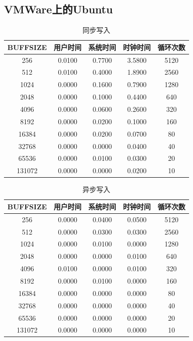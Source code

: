 \documentclass[a4paper,twoside]{article}
\begin{document}
\begin{spacing}{1.2}
\subsection{VMWare上的Ubuntu}


\begin{table}[H]
\centering
\caption{同步写入}
\begin{tabular}{c|c|c|c|c}
	\toprule
	\hline
	BUFFSIZE & 用户时间 & 系统时间 & 时钟时间 & 循环次数 \\
	\hline
	256   &   0.0100 & 0.7700 & 3.5800 & 5120
	\\512   &   0.0100 & 0.4000 & 1.8900 & 2560
	\\1024  &   0.0000 & 0.1600 & 0.7900 & 1280
	\\2048  &   0.0000 & 0.1000 & 0.4400 & 640
	\\4096  &   0.0000 & 0.0600 & 0.2600 & 320
	\\8192  &   0.0000 & 0.0200 & 0.1000 & 160
	\\16384 &   0.0000 & 0.0200 & 0.0700 & 80
	\\32768 &   0.0000 & 0.0000 & 0.0400 & 40
	\\65536 &   0.0000 & 0.0100 & 0.0300 & 20
	\\131072&   0.0000 & 0.0000 & 0.0200 & 10
	\\\hline
	\bottomrule
\end{tabular}	
\end{table}

\begin{table}[H]
\centering
\caption{异步写入}
\begin{tabular}{c|c|c|c|c}
	\toprule
	\hline
	BUFFSIZE & 用户时间 & 系统时间 & 时钟时间 & 循环次数 \\
	\hline
	256    &  0.0000 & 0.0400 & 0.0500 & 5120
	\\512    &  0.0000 & 0.0300 & 0.0300 & 2560
	\\1024   &  0.0000 & 0.0100 & 0.0000 & 1280
	\\2048   &  0.0000 & 0.0000 & 0.0100 & 640
	\\4096   &  0.0100 & 0.0000 & 0.0100 & 320
	\\8192   &  0.0000 & 0.0100 & 0.0000 & 160
	\\16384  &  0.0000 & 0.0000 & 0.0000 & 80
	\\32768  &  0.0000 & 0.0000 & 0.0000 & 40
	\\65536  &  0.0000 & 0.0000 & 0.0000 & 20
	\\131072 &  0.0000 & 0.0000 & 0.0000 & 10
	\\\hline
	\bottomrule
\end{tabular}	
\end{table}



\end{spacing}
\end{document}
